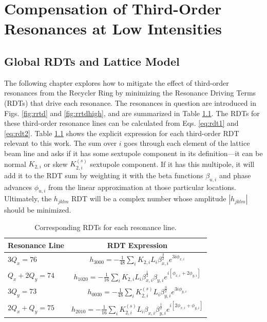 \chapter{Compensation of Third-Order Resonances at Low Intensities}
\label{sec:ch4}

\section{\label{sec:rdtslattice}Global RDTs and Lattice Model}

The following chapter explores how to mitigate the effect of third-order resonances from the Recycler Ring by minimizing the Resonance Driving Terms (RDTs) that drive each resonance. The resonances in question are introduced in Figs. \ref{fig:rrtd} and \ref{fig:rrtdhigh}, and are summarized in Table \ref{tab:rdts}. The RDTs for these third-order resonance lines can be calculated from Eqs. \ref{eq:rdt1} and \ref{eq:rdt2}. Table \ref{tab:rdts} shows the explicit expression for each third-order RDT relevant to this work. The sum over $i$ goes through each element of the lattice beam line and asks if it has some sextupole component in its definition---it can be normal $K_{2,i}$ or skew $K_{2,i}^{(s)}$ sextupole component. If it has this multipole, it will add it to the RDT sum by weighting it with the beta functions $\beta_{u,i}$ and phase advances $\phi_{u,i}$ from the linear approximation at those particular locations. Ultimately, the $h_{jklm}$ RDT will be a complex number whose amplitude $|h_{jklm}|$ should be minimized.

\begin{table}[H]
    \centering
    \caption{Corresponding RDTs for each resonance line.}
    \begin{tabular}{lc}
        \toprule
        \textbf{Resonance Line} & \textbf{RDT Expression} \\
        \midrule
            $3Q_x=76$     & $\displaystyle{h_{3000} = -\frac{1}{48}\sum_i K_{2,i} L_i \beta_{x,i}^{\frac{3}{2}} e^{3i\phi_{x,i}}}$    \\ %
           $Q_x+2Q_y=74$   &  $\displaystyle{h_{1020} = -\frac{1}{16} \sum_i K_{2,i} L_i \beta_{x,i}^{\frac{1}{2}} \beta_{y,i} e^{i \left[ \phi_{x,i} + 2\phi_{y,i}\right]} }$       \\ %
            $3Q_y=73$     &  $ \displaystyle{h_{0030} = -\frac{1}{48}\sum_i K_{2,i}^{(s)} L_i \beta_{y,i}^{\frac{3}{2}} e^{3i\phi_{y,i}}}$ \\ %
            $2Q_x+Q_y=75$   & $ \displaystyle{h_{2010} = -\frac{1}{16}\sum_i K_{2,i}^{(s)} L_i \beta_{x,i} \beta_{y,i}^{\frac{1}{2}} e^{i \left[ 2\phi_{x,i} + \phi_{y,i}\right]}}$       \\
        \bottomrule
    \end{tabular}
    \label{tab:rdts}
\end{table}

